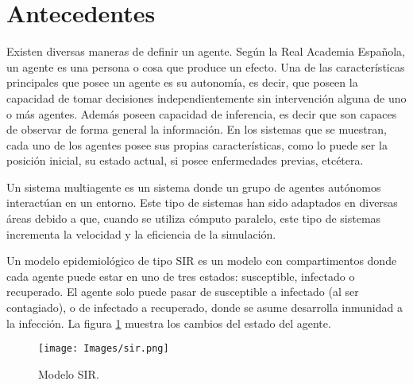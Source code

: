 \documentclass[final,6p,times,twocolumn]{elsarticle}
\begin{document}
	
	
	
	
	
	
	
	
	\section{Antecedentes}
	Existen diversas maneras de definir un agente. Según la Real Academia Española, un agente es una persona o cosa que produce un efecto. Una de las características principales que posee un agente es su autonomía, es decir, que poseen la capacidad de tomar decisiones independientemente sin intervención alguna de uno o más agentes. Además poseen capacidad de inferencia, es decir que son capaces de observar de forma general la información. En los sistemas que se muestran, cada uno de los agentes \cite{introductionmas} posee sus propias características, como lo puede ser la posición inicial, su estado actual, si posee enfermedades previas, etcétera.   
	
	Un sistema multiagente \cite{surveymas} es un sistema donde un grupo de agentes autónomos interactúan en un entorno. Este tipo de sistemas han sido adaptados en diversas áreas debido a que, cuando se utiliza cómputo paralelo, este tipo de sistemas incrementa la velocidad y la eficiencia de la simulación.
	
	Un modelo epidemiológico de tipo SIR es un modelo con compartimentos donde cada agente puede estar en uno de tres estados: susceptible, infectado o recuperado. El agente solo puede pasar de susceptible a infectado (al ser contagiado), o de infectado a recuperado, donde se asume desarrolla inmunidad a la infección. La figura \ref{sir} muestra los cambios del estado del agente.
	\begin{figure}
		\label{sir}
		\centering
		\texttt{[image: Images/sir.png]}
		\caption{Modelo SIR.}
	\end{figure}
	
	
	
	
	
	\label{S:2}
	
	
	
	
\end{document}
